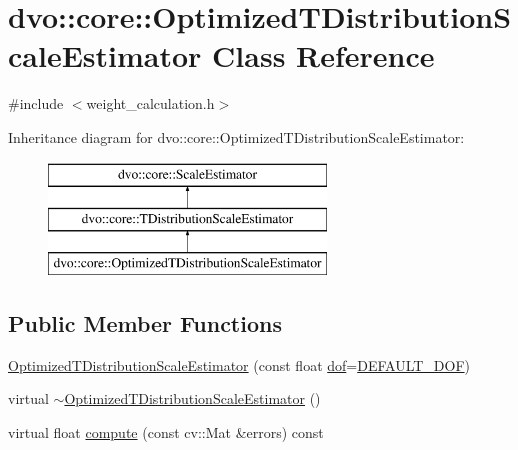 \hypertarget{classdvo_1_1core_1_1_optimized_t_distribution_scale_estimator}{}\section{dvo\+:\+:core\+:\+:Optimized\+T\+Distribution\+Scale\+Estimator Class Reference}
\label{classdvo_1_1core_1_1_optimized_t_distribution_scale_estimator}


{\ttfamily \#include $<$weight\+\_\+calculation.\+h$>$}

Inheritance diagram for dvo\+:\+:core\+:\+:Optimized\+T\+Distribution\+Scale\+Estimator\+:\begin{figure}[H]
\begin{center}
\leavevmode
\includegraphics[height=3.000000cm]{classdvo_1_1core_1_1_optimized_t_distribution_scale_estimator}
\end{center}
\end{figure}
\subsection*{Public Member Functions}
\begin{DoxyCompactItemize}
\item 
\mbox{\hyperlink{classdvo_1_1core_1_1_optimized_t_distribution_scale_estimator_a05c83a7876c15949f24cb16c41ea2464}{Optimized\+T\+Distribution\+Scale\+Estimator}} (const float \mbox{\hyperlink{classdvo_1_1core_1_1_t_distribution_scale_estimator_a4c5ece510a3315bad7ca711a27466eb9}{dof}}=\mbox{\hyperlink{classdvo_1_1core_1_1_t_distribution_scale_estimator_a031ff291023c516c23bce04b34b79957}{D\+E\+F\+A\+U\+L\+T\+\_\+\+D\+OF}})
\item 
virtual \mbox{\hyperlink{classdvo_1_1core_1_1_optimized_t_distribution_scale_estimator_a929ac3c2914a6e150275a4d12ae8222c}{$\sim$\+Optimized\+T\+Distribution\+Scale\+Estimator}} ()
\item 
virtual float \mbox{\hyperlink{classdvo_1_1core_1_1_optimized_t_distribution_scale_estimator_ace9304a785bd16a6ef5cf4a52f3c6299}{compute}} (const cv\+::\+Mat \&errors) const
\end{DoxyCompactItemize}
